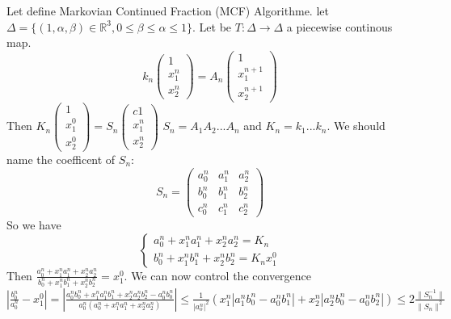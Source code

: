\documentclass[12pt]{article}
\theoremstyle{plain}%
\theoremstyle{definition}
\theoremstyle{remark}
\begin{document}
Let define Markovian Continued Fraction (MCF) Algorithme. let $\Delta= \{ (1,\alpha,\beta) \in \mathbb{R}^3,0 \leq \beta \leq \alpha \leq 1 \}$. Let be $T : \Delta \to \Delta$ a piecewise continous map.\newline
$$ k_n
\begin{pmatrix} 1 \\ x_1^n \\ x_2^n \end{pmatrix}=
A_n \begin{pmatrix} 1 \\ x_1^{n+1} \\ x_2^{n+1} \end{pmatrix}
$$
Then $K_n \begin{pmatrix} 1 \\x_1^0 \\ x_2^0 \end{pmatrix} = S_n \begin{pmatrix}{c} 1 \\ x_1^n \\ x_2^n \end{pmatrix}$\newline
$S_n=A_1 A_2 ... A_n$ and $K_n=k_1 ... k_n$. We should name the coefficent of $S_n$:$$
S_n=\begin{pmatrix}
a_0^n & a_1^n & a_2^n \\
b_0^n & b_1^n & b_2^n \\
c_0^n & c_1^n & c_2^n
\end{pmatrix}
$$
So we have
$$
\left \{
\begin{array}{l}
a_0^n+x_1^n a_1^n +x_2^n a_2^n=K_n\\
b_0^n+x_1^n b_1^n +x_2^n b_2^n=K_n x_1^0
\end{array}
\right .
$$
Then $\frac{a_0^n+x_1^n a_1^n +x_2^n a_2^n}{b_0^n+x_1^n b_1^n +x_2^n b_2^n}=x_1^0$.\newline
We can now control the convergence $| \frac{b_0^n}{a_0^n}-x_1^0 |= | \frac{a_0^n b_0^n+x_1^n a_1^n b_1^n +x_2^n a_2^n b_2^n-a_0^n b_0^n}{a_0^n(a_0^n+x_1^n a_1^n +x_2^n a_2^n)} | \leq \frac{1}{|a_o^n|^2}(x_1^n |a_1^n b_0^n - a_0^n b_1^n |+x_2^n |a_2^n b_0^n - a_0^n b_2^n |) \leq 2 \frac{\|S_n^{-1} \|}{\| S_n \|^2}$
\end{document}
